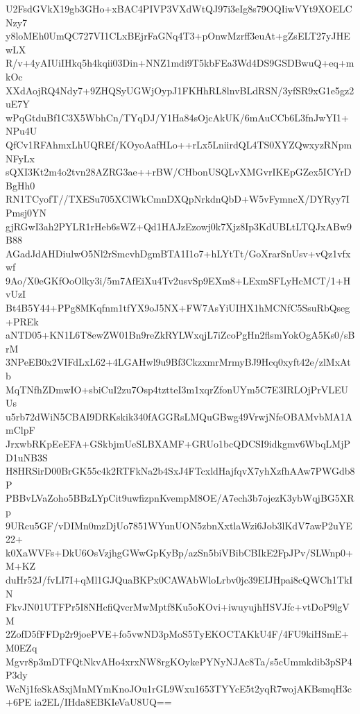 U2FsdGVkX19gb3GHo+xBAC4PIVP3VXdWtQJ97i3eIg8s79OQIiwVYt9XOELCNzy7
y8loMEh0UmQC727VI1CLxBEjrFaGNq4T3+pOnwMzrff3euAt+gZsELT27yJHEwLX
R/v+4yAIUiIHkq5h4kqii03Din+NNZ1mdi9T5kbFEa3Wd4DS9GSDBwuQ+eq+mkOc
XXdAojRQ4Ndy7+9ZHQSyUGWjOypJ1FKHhRL8lnvBLdRSN/3yfSR9xG1e5gz2uE7Y
wPqGtduBf1C3X5WbhCn/TYqDJ/Y1Ha84sOjcAkUK/6mAuCCb6L3fnJwYI1+NPu4U
QfCv1RFAhmxLhUQREf/KOyoAafHLo++rLx5LniirdQL4TS0XYZQwxyzRNpmNFyLx
sQXI3Kt2m4o2tvn28AZRG3ae++rBW/CHbonUSQLvXMGvrIKEpGZex5ICYrDBgHh0
RN1TCyofT//TXESu705XClWkCmnDXQpNrkdnQbD+W5vFymncX/DYRyy7IPmsj0YN
gjRGwI3ah2PYLR1rHeb6sWZ+Qd1HAJzEzowj0k7Xjz8Ip3KdUBLtLTQJxABw9B88
AGadJdAHDiulwO5Nl2rSmcvhDgmBTA1I1o7+hLYtTt/GoXrarSnUsv+vQz1vfxwf
9Ao/X0eGKfOoOlky3i/5m7AfEiXu4Tv2usvSp9EXm8+LExmSFLyHcMCT/1+HvUzI
Bt4B5Y44+PPg8MKqfnm1tfYX9oJ5NX+FW7AsYiUIHX1hMCNfC5SsuRbQseg+PREk
aNTD05+KN1L6T8ewZW01Bn9reZkRYLWxqjL7iZcoPgHn2flsmYokOgA5Ks0/sBrM
3NPeEB0x2VIFdLxL62+4LGAHwl9u9Bf3CkzxmrMrmyBJ9Hcq0xyft42e/zlMxAtb
MqTNfhZDmwIO+sbiCuI2zu7Osp4tztteI3m1xqrZfonUYm5C7E3IRLOjPrVLEUUs
u5rb72dWiN5CBAI9DRKskik340fAGGRsLMQuGBwg49VrwjNfeOBAMvbMA1AmClpF
JrxwbRKpEeEFA+GSkbjmUeSLBXAMF+GRUo1bcQDCSI9idkgmv6WbqLMjPD1uNB3S
H8HRSirD00BrGK55c4k2RTFkNa2b4SxJ4FTcxldHajfqvX7yhXzfhAAw7PWGdb8P
PBBvLVaZoho5BBzLYpCit9uwfizpnKvempM8OE/A7ech3b7ojezK3ybWqjBG5XRp
9URcu5GF/vDIMn0mzDjUo7851WYunUON5zbnXxtlaWzi6Job3lKdV7awP2uYE22+
k0XaWVFs+DkU6OsVzjhgGWwGpKyBp/azSn5biVBibCBIkE2FpJPv/SLWnp0+M+KZ
duHr52J/fvLI7I+qMl1GJQuaBKPx0CAWAbWloLrbv0jc39EIJHpai8cQWCh1TkIN
FkvJN01UTFPr5I8NHcfiQvcrMwMptf8Ku5oKOvi+iwuyujhHSVJfc+vtDoP9lgVM
2ZofD5fFFDp2r9joePVE+fo5vwND3pMoS5TyEKOCTAKkU4F/4FU9kiHSmE+M0EZq
Mgvr8p3mDTFQtNkvAHo4xrxNW8rgKOykePYNyNJAc8Ta/s5cUmmkdib3pSP4P3dy
WcNj1feSkASxjMnMYmKnoJOu1rGL9Wxu1653TYYcE5t2yqR7wojAKBsmqH3c+6PE
ia2EL/IHda8EBKIeVaU8UQ==
